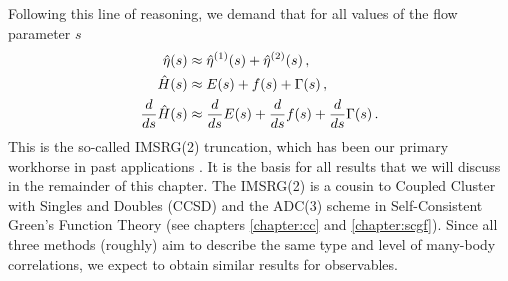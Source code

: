 {Following this line of reasoning,  we demand that for all values of the
flow parameter $s$
\begin{align} 
  \etaO(s) &\approx\etaO^{(1)}(s)+\etaO^{(2)}(s)\,,\label{eq:imsrg2_eta}\\
  \HO(s) &\approx E(s) + f(s) + \Gamma(s)\,,\label{eq:imsrg2_H}\\
  \totd{}{s}\HO(s) &\approx \totd{}{s}E(s) + \totd{}{s}f(s) + \totd{}{s}\Gamma(s)\label{eq:imsrg2_dH}\,.
\end{align}
This is the so-called IMSRG(2) truncation, which has been our primary
workhorse in past applications 
\cite{Tsukiyama:2011uq,Tsukiyama:2012fk,Hergert:2013mi,Hergert:2013ij,Hergert:2014vn,Morris:2015ve,Hergert:2016jk}. It is the basis for all results that we will discuss in the remainder of this chapter. 
The IMSRG(2) is a cousin to Coupled Cluster with Singles and Doubles
(CCSD) and the ADC(3) scheme in Self-Consistent Green's Function Theory 
(see chapters \ref{chapter:cc} and \ref{chapter:scgf}). Since all three
methods (roughly) aim to describe the same type and level of many-body 
correlations, we expect to obtain similar results for observables.

}
